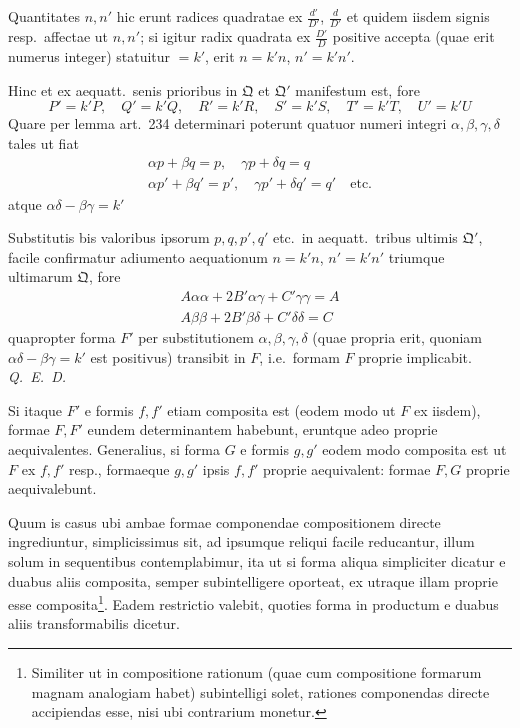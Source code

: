 \documentclass[12pt,a4paper]{article}
\theoremstyle{plain}
\theoremstyle{definition}
\theoremstyle{remark}
\theoremstyle{problemstyle}
\begin{document}
Quantitates $n, n'$ hic erunt radices quadratae ex $\frac{d'}{D'}$, $\frac{d}{D'}$ et quidem iisdem signis resp.\ affectae ut $n, n'$; si igitur radix quadrata ex $\frac{D'}{D}$ positive accepta (quae erit numerus integer) statuitur $= k'$, erit $n = k'n$, $n' = k'n'$.

Hinc et ex aequatt.\ senis prioribus in $\mathfrak{Q}$ et $\mathfrak{Q}'$ manifestum est, fore
\[
P' = k'P, \quad Q' = k'Q, \quad R' = k'R, \quad S' = k'S, \quad T' = k'T, \quad U' = k'U
\]
Quare per lemma art.\ 234 determinari poterunt quatuor numeri integri $\alpha, \beta, \gamma, \delta$ tales ut fiat
\begin{gather*}
\alpha p + \beta q = p, \quad \gamma p + \delta q = q \\
\alpha p' + \beta q' = p', \quad \gamma p' + \delta q' = q' \quad \text{etc.}
\end{gather*}
atque $\alpha\delta - \beta\gamma = k'$

Substitutis bis valoribus ipsorum $p, q, p', q'$ etc.\ in aequatt.\ tribus ultimis $\mathfrak{Q}'$, facile confirmatur adiumento aequationum $n = k'n$, $n' = k'n'$ triumque ultimarum $\mathfrak{Q}$, fore
\begin{gather*}
A\alpha\alpha + 2B'\alpha\gamma + C'\gamma\gamma = A \\
A\beta\beta + 2B'\beta\delta + C'\delta\delta = C
\end{gather*}
quapropter forma $F'$ per substitutionem $\alpha, \beta, \gamma, \delta$ (quae propria erit, quoniam $\alpha\delta - \beta\gamma = k'$ est positivus) transibit in $F$, i.e.\ formam $F$ proprie implicabit. \emph{Q.\ E.\ D.}

Si itaque $F'$ e formis $f, f'$ etiam composita est (eodem modo ut $F$ ex iisdem), formae $F, F'$ eundem determinantem habebunt, eruntque adeo proprie aequivalentes. Generalius, si forma $G$ e formis $g, g'$ eodem modo composita est ut $F$ ex $f, f'$ resp., formaeque $g, g'$ ipsis $f, f'$ proprie aequivalent: formae $F, G$ proprie aequivalebunt.

Quum is casus ubi ambae formae componendae compositionem directe ingrediuntur, simplicissimus sit, ad ipsumque reliqui facile reducantur, illum solum in sequentibus contemplabimur, ita ut si forma aliqua simpliciter dicatur e duabus aliis composita, semper subintelligere oporteat, ex utraque illam proprie esse composita\footnote{Similiter ut in compositione rationum (quae cum compositione formarum magnam analogiam habet) subintelligi solet, rationes componendas directe accipiendas esse, nisi ubi contrarium monetur.}. Eadem restrictio valebit, quoties forma in productum e duabus aliis transformabilis dicetur.
\end{document}
